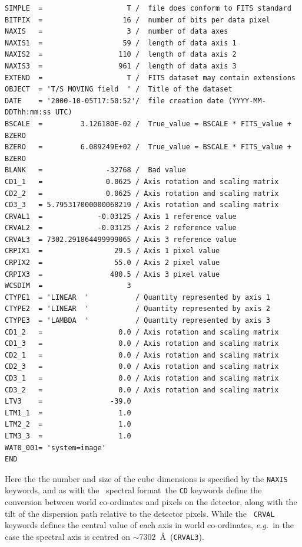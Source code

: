 \documentclass[twoside,11pt]{article}
\newcommand{\htmlref}[2]{#1}
\begin{document}
\small\begin{verbatim}
SIMPLE  =                    T /  file does conform to FITS standard
BITPIX  =                   16 /  number of bits per data pixel
NAXIS   =                    3 /  number of data axes
NAXIS1  =                   59 /  length of data axis 1
NAXIS2  =                  110 /  length of data axis 2
NAXIS3  =                  961 /  length of data axis 3
EXTEND  =                    T /  FITS dataset may contain extensions
OBJECT  = 'T/S MOVING field  ' /  Title of the dataset
DATE    = '2000-10-05T17:50:52'/  file creation date (YYYY-MM-DDThh:mm:ss UTC)
BSCALE  =         3.126180E-02 /  True_value = BSCALE * FITS_value + BZERO
BZERO   =         6.089249E+02 /  True_value = BSCALE * FITS_value + BZERO
BLANK   =               -32768 /  Bad value
CD1_1   =               0.0625 / Axis rotation and scaling matrix
CD2_2   =               0.0625 / Axis rotation and scaling matrix
CD3_3   = 5.795317000000068219 / Axis rotation and scaling matrix
CRVAL1  =             -0.03125 / Axis 1 reference value
CRVAL2  =             -0.03125 / Axis 2 reference value
CRVAL3  = 7302.291864499999065 / Axis 3 reference value
CRPIX1  =                 29.5 / Axis 1 pixel value
CRPIX2  =                 55.0 / Axis 2 pixel value
CRPIX3  =                480.5 / Axis 3 pixel value
WCSDIM  =                    3   
CTYPE1  = 'LINEAR  '           / Quantity represented by axis 1
CTYPE2  = 'LINEAR  '           / Quantity represented by axis 2
CTYPE3  = 'LAMBDA  '           / Quantity represented by axis 3
CD1_2   =                  0.0 / Axis rotation and scaling matrix
CD1_3   =                  0.0 / Axis rotation and scaling matrix
CD2_1   =                  0.0 / Axis rotation and scaling matrix
CD2_3   =                  0.0 / Axis rotation and scaling matrix
CD3_1   =                  0.0 / Axis rotation and scaling matrix
CD3_2   =                  0.0 / Axis rotation and scaling matrix
LTV3    =                -39.0   
LTM1_1  =                  1.0   
LTM2_2  =                  1.0  
LTM3_3  =                  1.0  
WAT0_001= 'system=image'
END
\end{verbatim}\normalsize

Here the the number and size of the cube dimensions is specified by
the {\tt NAXIS} keywords, and as with the \htmlref{\IRAF\ spectral
format}{sc16_iraf}\normalsize\ the {\tt CD} keywords define the conversion between
world co-ordinates and pixels on the detector, along with the tilt of
the dispersion path relative to the detector pixels.  While the {\tt
CRVAL} keywords defines the central value of each axis in world
co-ordinates, \emph{e.g.}\ in the case the spectral axis is centred on
$\sim$7302~\AA\ ({\tt CRVAL3}).
\end{document}

